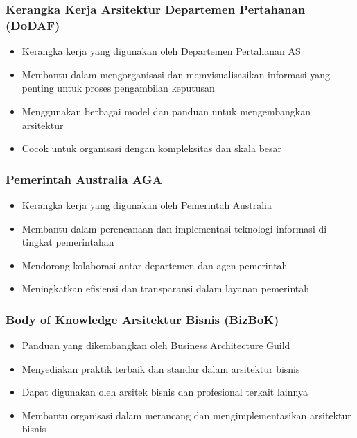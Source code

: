 \documentclass{beamer}
\begin{document}
	\begin{frame}
		\frametitle{Kerangka Kerja Arsitektur Departemen Pertahanan (DoDAF)}
		\begin{itemize}
			\item Kerangka kerja yang digunakan oleh Departemen Pertahanan AS
			\item Membantu dalam mengorganisasi dan memvisualisasikan informasi yang penting untuk proses pengambilan keputusan
			\item Menggunakan berbagai model dan panduan untuk mengembangkan arsitektur
			\item Cocok untuk organisasi dengan kompleksitas dan skala besar
		\end{itemize}
	\end{frame}
	
	\begin{frame}
		\frametitle{Pemerintah Australia AGA}
		\begin{itemize}
			\item Kerangka kerja yang digunakan oleh Pemerintah Australia
			\item Membantu dalam perencanaan dan implementasi teknologi informasi di tingkat pemerintahan
			\item Mendorong kolaborasi antar departemen dan agen pemerintah
			\item Meningkatkan efisiensi dan transparansi dalam layanan pemerintah
		\end{itemize}
	\end{frame}
	
	
	\begin{frame}
		\frametitle{Body of Knowledge Arsitektur Bisnis (BizBoK)}
		\begin{itemize}
			\item Panduan yang dikembangkan oleh Business Architecture Guild
			\item Menyediakan praktik terbaik dan standar dalam arsitektur bisnis
			\item Dapat digunakan oleh arsitek bisnis dan profesional terkait lainnya
			\item Membantu organisasi dalam merancang dan mengimplementasikan arsitektur bisnis
		\end{itemize}
	\end{frame}
	
\end{document}
